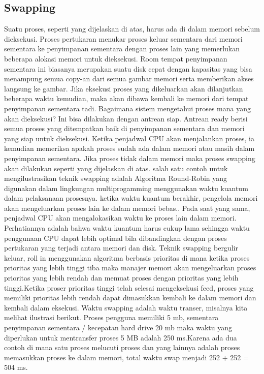 \subsection {Swapping}
Suatu proses, seperti yang dijelaskan di atas, harus ada di dalam memori sebelum dieksekusi. Proses pertukaran menukar proses keluar sementara dari memori sementara ke penyimpanan sementara dengan proses lain yang memerlukan beberapa alokasi memori untuk dieksekusi. Room tempat penyimpanan sementara ini biasanya merupakan suatu disk cepat dengan kapasitas yang bisa menampung semua copy-an dari semua gambar memori serta memberikan akses langsung ke gambar. Jika eksekusi proses yang dikeluarkan akan dilanjutkan beberapa waktu kemudian, maka akan dibawa kembali ke memori dari tempat penyimpanan sementara tadi. Bagaimana sistem mengetahui proses mana yang akan dieksekusi?
Ini bisa dilakukan dengan antrean siap. Antrean ready berisi semua proses yang ditempatkan baik di penyimpanan sementara dan memori yang siap untuk dieksekusi. Ketika penjadwal CPU akan menjalankan proses, ia kemudian memeriksa apakah proses sudah ada dalam memori atau masih dalam penyimpanan sementara. Jika proses tidak dalam memori maka proses swapping akan dilakukan seperti yang dijelaskan di atas.
salah satu contoh untuk mengilustrasikan teknik swapping adalah Algoritma Round-Robin yang digunakan dalam lingkungan multiprogamming menggunakan waktu kuantum dalam pelaksanaan prosesnya. ketika waktu kuantum berakhir, pengelola memori akan mengeluarkan proses lain ke dalam memori bebas.. Pada saat yang sama, penjadwal CPU akan mengalokasikan waktu ke proses lain dalam memori. Perhatiannya adalah bahwa waktu kuantum harus cukup lama sehingga waktu penggunaan CPU dapat lebih optimal bila dibandingkan dengan proses pertukaran yang terjadi antara memori dan disk.
Teknik swapping bergulir keluar, roll in menggunakan algoritma berbasis prioritas di mana ketika proses prioritas yang lebih tinggi tiba maka manajer memori akan mengeluarkan proses prioritas yang lebih rendah dan memuat proses dengan prioritas yang lebih tinggi.Ketika proser prioritas tinggi telah selesai mengeksekusi feed, proses yang memiliki prioritas lebih rendah dapat dimasukkan kembali ke dalam memori dan kembali dalam eksekusi.
Waktu swapping adalah waktu transer, misalnya kita melihat ilustrasi berikut. Proses pengguna memiliki 5 mb, sementara penyimpanan sementara / kecepatan hard drive 20 mb maka waktu yang diperlukan untuk mentransfer proses 5 MB adalah 250 ms.Karena ada dua contoh di mana satu proses melucuti proses dan yang lainnya adalah proses memasukkan proses ke dalam memori, total waktu swap menjadi 252 + 252 = 504 ms.

